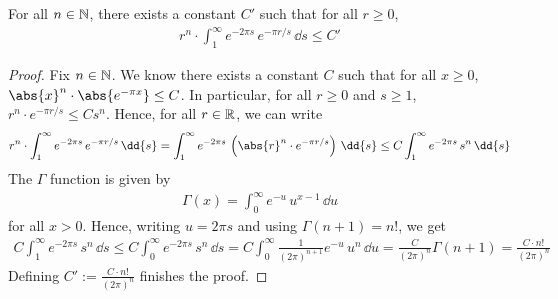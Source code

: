\begin{lemma}\label{lem:integral-bound}
    For all $n \in \mathbb{N}$, there exists a constant $C'$ such that for all $r \geq 0$,
    \begin{align}
        r^n \cdot \int_{1}^{\infty} e^{-2\pi s} \, e^{-\pi r /s} \, \dd s \leq C'
    \end{align}
\end{lemma}
\begin{proof}
    Fix $n \in \mathbb{N}$. We know there exists a constant $C$ such that for all $x \geq 0$, $\abs{x}^n \cdot \abs{e^{-\pi x}} \leq C$. In particular, for all $r \geq 0$ and $s \geq 1$, $r^n \cdot e^{-\pi r/s} \leq C s^n$. Hence, for all $r \in \mathbb{R}$, we can write
    \begin{align}
        r^n \cdot \int_{1}^{\infty} e^{-2\pi s} \, e^{-\pi r /s} \, \dd{s}
        = \int_{1}^{\infty} e^{-2\pi s} \, \left(\abs{r}^n \cdot e^{-\pi r /s}\right) \, \dd{s}
        \leq C \int_{1}^{\infty} e^{-2\pi s} \, s^n \, \dd{s}
    \end{align}
    The $\Gamma$ function is given by
    \begin{align}
        \Gamma(x) = \int_{0}^{\infty} e^{-u} \, u^{x-1} \, \dd{u}
    \end{align}
    for all $x > 0$. Hence, writing $u = 2\pi s$ and using $\Gamma(n+1) = n!$, we get
    \begin{align}
        C \int_{1}^{\infty} e^{-2\pi s} \, s^n \, \dd{s}
        \leq C \int_{0}^{\infty} e^{-2\pi s} \, s^n \, \dd{s}
        = C \int_{0}^{\infty} \frac{1}{(2\pi)^{n+1}} e^{-u} \, u^n \, \dd{u}
        = \frac{C}{(2\pi)^n} \Gamma(n+1)
        = \frac{C \cdot n!}{(2\pi)^n}
    \end{align}
    Defining $C' := \frac{C \cdot n!}{(2\pi)^n}$ finishes the proof.
\end{proof}

